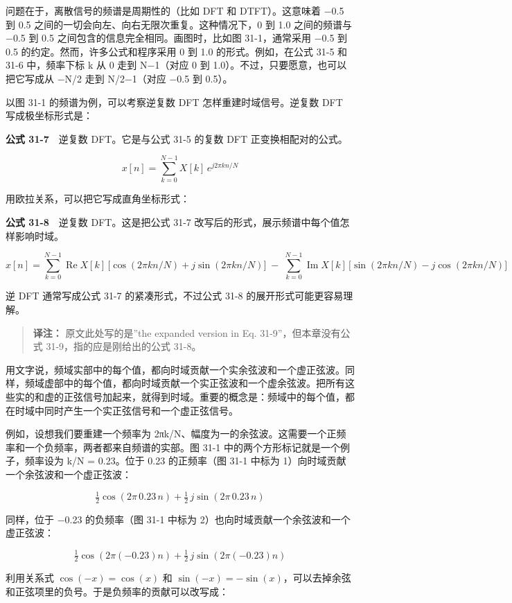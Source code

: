 问题在于，离散信号的频谱是周期性的（比如 DFT 和 DTFT）。这意味着 −0.5 到
0.5 之间的一切会向左、向右无限次重复。这种情况下，0 到 1.0 之间的频谱与
−0.5 到 0.5 之间包含的信息完全相同。画图时，比如图 31-1，通常采用 −0.5
到 0.5 的约定。然而，许多公式和程序采用 0 到 1.0 的形式。例如，在公式
31-5 和 31-6 中，频率下标 k 从 0 走到 N−1（对应 0 到
1.0）。不过，只要愿意，也可以把它写成从 −N/2 走到 N/2−1（对应 −0.5 到
0.5）。

以图 31-1 的频谱为例，可以考察逆复数 DFT 怎样重建时域信号。逆复数 DFT
写成极坐标形式是：

\textbf{公式 31-7}　逆复数 DFT。它是与公式 31-5 的复数 DFT
正变换相配对的公式。

\[x[n] = \sum_{k=0}^{N-1} X[k]\,e^{j2\pi kn/N}\]

用欧拉关系，可以把它写成直角坐标形式：

\textbf{公式 31-8}　逆复数 DFT。这是把公式 31-7
改写后的形式，展示频谱中每个值怎样影响时域。

\[x[n] = \sum_{k=0}^{N-1} \operatorname{Re}X[k]\,\big[\cos(2\pi kn/N) + j\sin(2\pi kn/N)\big] \;-\; \sum_{k=0}^{N-1} \operatorname{Im}X[k]\,\big[\sin(2\pi kn/N) - j\cos(2\pi kn/N)\big]\]

逆 DFT 通常写成公式 31-7 的紧凑形式，不过公式 31-8
的展开形式可能更容易理解。

\begin{quote}
\textbf{译注：} 原文此处写的是''the expanded version in Eq.
31-9''，但本章没有公式 31-9，指的应是刚给出的公式 31-8。
\end{quote}

用文字说，频域实部中的每个值，都向时域贡献一个实余弦波和一个虚正弦波。同样，频域虚部中的每个值，都向时域贡献一个实正弦波和一个虚余弦波。把所有这些实的和虚的正弦信号加起来，就得到时域。重要的概念是：频域中的每个值，都在时域中同时产生一个实正弦信号和一个虚正弦信号。

例如，设想我们要重建一个频率为
2πk/N、幅度为一的余弦波。这需要一个正频率和一个负频率，两者都来自频谱的实部。图
31-1 中的两个方形标记就是一个例子，频率设为 k/N = 0.23。位于 0.23
的正频率（图 31-1 中标为 1）向时域贡献一个余弦波和一个虚正弦波：

\[\tfrac{1}{2}\cos(2\pi\,0.23\,n) + \tfrac{1}{2}\,j\sin(2\pi\,0.23\,n)\]

同样，位于 −0.23 的负频率（图 31-1 中标为
2）也向时域贡献一个余弦波和一个虚正弦波：

\[\tfrac{1}{2}\cos(2\pi(-0.23)n) + \tfrac{1}{2}\,j\sin(2\pi(-0.23)n)\]

利用关系式 \(\cos(-x) = \cos(x)\) 和
\(\sin(-x) = -\sin(x)\)，可以去掉余弦和正弦项里的负号。于是负频率的贡献可以改写成：

